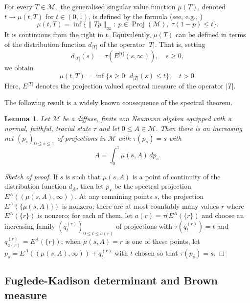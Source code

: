 \documentclass{amsart}
\theoremstyle{plain}
\newtheorem{lem}[thm]{Lemma}
\theoremstyle{remark}
\begin{document}
For every $T\in\mathcal{M},$ the generalised singular value function $\mu(T)$, denoted $t\to\mu(t,T)$ for $t\in(0,1)$,
is defined by the formula (see, e.g., \cite{FackKosaki})
$$\mu(t,T)=\inf\{\|Tp\|_{\infty}:\ p\in\operatorname{Proj}(\mathcal{M}),\;\tau(1-p)\leq t\}.$$
It is continuous from the right in $t.$ Equivalently, $\mu(T)$ can be defined in terms of the distribution function $d_{|T|}$ of the operator $|T|.$ That is, setting
$$d_{|T|}(s)=\tau(E^{|T|}(s,\infty)),\quad s\geq0,$$
we obtain
$$\mu(t,T)=\inf\{s\geq0:\ d_{|T|}(s)\leq t\},\quad t>0.$$
Here, $E^{|T|}$ denotes the projection valued spectral measure of the operator $|T|.$

The following result is a widely known consequence of the spectral theorem.

\begin{lem}\label{boolean lemma} Let $\mathcal{M}$ be a diffuse, finite von Neumann algebra equipped with a normal, faithful, tracial state $\tau$ and let $0\leq A\in\mathcal{M}$.
Then there is an increasing net $(p_s)_{0\le s\le1}$ of projections in $\mathcal{M}$ with $\tau(p_s)=s$
with
\[
A=\int_0^1 \mu(s,A)\,dp_s.
\]
\end{lem}
\begin{proof}[Sketch of proof]
If $s$ is such that $\mu(s,A)$ is a point of continuity of the distribution function $d_A$,
then let $p_s$ be the spectral projection $E^A((\mu(s,A),\infty))$.
At any remaining points $s$, the projection $E^A(\{\mu(s,A)\})$ is nonzero;
there are at most countably many values $r$ where $E^A(\{r\})$ is nonzero;
for each of them, let $a(r)=\tau(E^A(\{r\})$ and
choose an increasing family $(q^{(r)}_t)_{0\le t\le a(r)}$ of projections with $\tau(q^{(r)}_t)=t$ and $q^{(r)}_{a(r)}=E^A(\{r\})$;
when $\mu(s,A)=r$ is one of these points,
let $p_s=E^A((\mu(s,A),\infty))+q^{(r)}_t$ with $t$ chosen so that $\tau(p_s)=s$.
\end{proof}

\subsection{Fuglede-Kadison determinant and Brown measure}
\label{subsec:FK}
\end{document}
